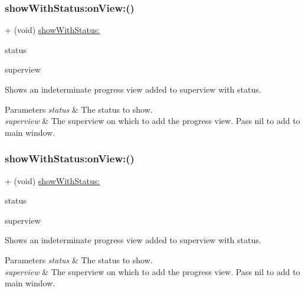 \subsubsection{\texorpdfstring{show\+With\+Status\+:on\+View\+:()}{showWithStatus:onView:()}\hspace{0.1cm}{\footnotesize\ttfamily [2/3]}}
{\footnotesize\ttfamily + (void) \mbox{\hyperlink{interface_k_v_n_progress_af86acbff98a05f0ee39e746628b02022}{show\+With\+Status\+:}} \begin{DoxyParamCaption}\item[{(N\+S\+String $\ast$)}]{status }\item[{onView:(U\+I\+View $\ast$)}]{superview }\end{DoxyParamCaption}}

Shows an indeterminate progress view added to {\ttfamily superview} with {\ttfamily status}. 
\begin{DoxyParams}{Parameters}
{\em status} & The status to show. \\
\hline
{\em superview} & The superview on which to add the progress view. Pass {\ttfamily nil} to add to main window. \\
\hline
\end{DoxyParams}
\mbox{\label{interface_k_v_n_progress_ae317161c16121fa1b3dcdb9c1e9f7a8f}} 
\subsubsection{\texorpdfstring{show\+With\+Status\+:on\+View\+:()}{showWithStatus:onView:()}\hspace{0.1cm}{\footnotesize\ttfamily [3/3]}}
{\footnotesize\ttfamily + (void) \mbox{\hyperlink{interface_k_v_n_progress_af86acbff98a05f0ee39e746628b02022}{show\+With\+Status\+:}} \begin{DoxyParamCaption}\item[{(N\+S\+String $\ast$)}]{status }\item[{onView:(U\+I\+View $\ast$)}]{superview }\end{DoxyParamCaption}}

Shows an indeterminate progress view added to {\ttfamily superview} with {\ttfamily status}. 
\begin{DoxyParams}{Parameters}
{\em status} & The status to show. \\
\hline
{\em superview} & The superview on which to add the progress view. Pass {\ttfamily nil} to add to main window. \\
\hline
\end{DoxyParams}
\mbox{\label{interface_k_v_n_progress_a70c537364b9ea751af24178448335b98}} 
